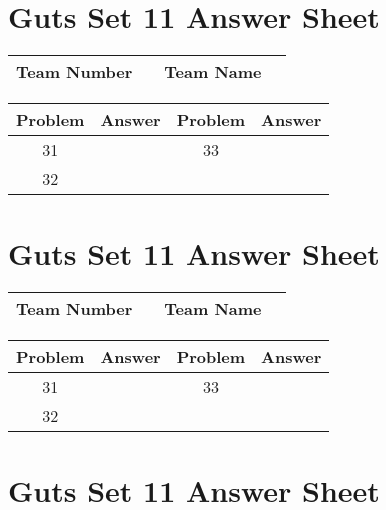 \documentclass[14pt]{article}
\begin{document}
\section*{Guts Set 11 Answer Sheet}

\begin{center}
\begin{tabular}{|r|r|r|r|}
\hline
	Team Number & \hspace{10em} &
	Team Name & \hspace{15em} \\ \hline
\end{tabular}
\end{center}
\begin{tabularx}{\textwidth}{|c|l|c|X|}\hline
	Problem & Answer & Problem & Answer \\\hline
	31 & \hspace{15em} & 33 & \\\hline
	32 & & & \\\hline
\end{tabularx}

\vspace{30px}

\section*{Guts Set 11 Answer Sheet}

\begin{center}
\begin{tabular}{|r|r|r|r|}
\hline
	Team Number & \hspace{10em} &
	Team Name & \hspace{15em} \\ \hline
\end{tabular}
\end{center}
\begin{tabularx}{\textwidth}{|c|l|c|X|}\hline
	Problem & Answer & Problem & Answer \\\hline
	31 & \hspace{15em} & 33 & \\\hline
	32 & & & \\\hline
\end{tabularx}

\vspace{30px}

\section*{Guts Set 11 Answer Sheet}
\end{document}
